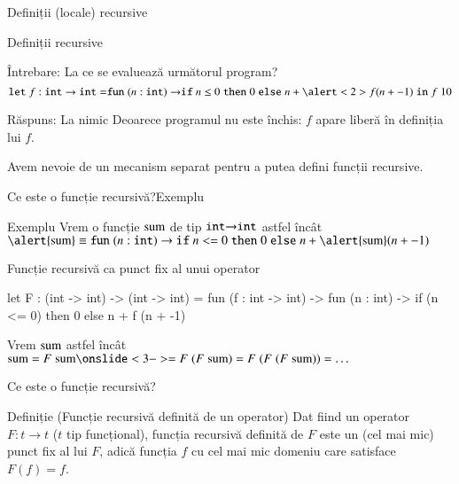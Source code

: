 \documentclass[xcolor=pdftex,romanian,colorlinks]{beamer}
\begin{document}
\begin{section}{Definiții (locale) recursive}

\begin{frame}{Definiții recursive }
\begin{block}{Întrebare: La ce se evaluează următorul program?}
\small
\[\Slet f : {{\Sint}\rightarrow {\Sint}} = \Sfun (n:{\Sint})\rightarrow \Sif n \leq 0 \Sthen 0 \Selse n + \alert<2>{f} (n + -1) \Sin f\; 10\] 
\end{block}

\begin{alertblock}{Răspuns: La nimic}
Deoarece programul nu este închis: $f$ apare liberă în definiția lui $f$. 

Avem nevoie de un mecanism separat  pentru a putea defini funcții recursive.
\end{alertblock}

\end{frame}


\begin{frame}[fragile]{Ce este o funcție recursivă?}{Exemplu}
\begin{block}{Exemplu}
  Vrem o funcție ${\rm sum}$ de tip $\mathrel{\text{\ttfamily int}} \rightarrow \mathrel{\text{\ttfamily int}}$ astfel încât
 $\alert{\rm sum} \equiv  
  {\Sfun (n : {\Sint}) \rightarrow
    {\Sif n <= 0 \Sthen 0 \Selse n + \alert{\rm sum} (n + -1)}}$
\end{block}

\begin{block}{Funcție recursivă ca punct fix al unui operator}
\begin{asciiml}
let F : (int -> int) -> (int -> int) =  fun (f : int -> int) -> 
  fun (n : int) -> if (n <= 0) then 0 else n + f (n + -1)
\end{asciiml}

Vrem ${\rm sum}$ astfel încât ${\rm sum} = F\; {\rm sum}\onslide<3-> = F\; (F\; {\rm sum}) = F\; (F\; (F\; {\rm sum})) = \ldots$
\end{block}

\end{frame}

\begin{frame}{Ce este o funcție recursivă?}
\begin{block}{Definiție (Funcție recursivă definită de un operator)}
Dat fiind un operator $F : t \rightarrow t$ ($t$ tip funcțional), funcția recursivă definită de $F$ este un (cel mai mic) punct fix al lui $F$, adică funcția $f$ cu cel mai mic domeniu care satisface $F(f) = f$.
\end{block} 


\end{frame}
\end{section}
\end{document}
